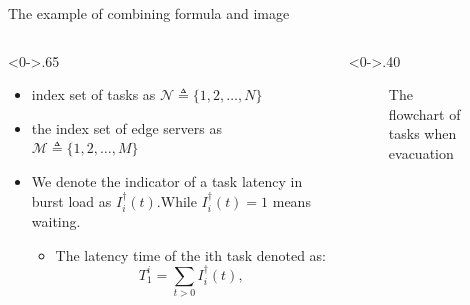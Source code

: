 \documentclass{beamer}%
\begin{document}
\begin{frame}{The example of combining formula and image}
	\begin{columns}[T] %
		\begin{column}<0->{.65\textwidth}
			\begin{itemize}
				\item<1-> index set of tasks as $\mathcal{N} \triangleq\{1,2, \ldots, N\}$
				\item<1->the index set of edge servers as $\mathcal{M} \triangleq\{1,2, \ldots, M\}$
				\item<1->We denote the indicator of a task latency in burst load as $I^{\dagger }_i(t)$.While $I^{\dagger }_i(t) = 1$  means waiting.
				      
				      \begin{itemize}
					      \item<1->The latency time of the ith task denoted as:
					            \begin{equation*} T_1^i = \sum _{t>0} I^{\dagger }_i(t), \tag{1}
					            \end{equation*}
				      \end{itemize}
			\end{itemize}
		\end{column}%
		\hfill%
		\begin{column}<0->{.40\textwidth}
			\begin{figure}[thpb]
				\centering
				\caption{The flowchart of tasks when evacuation}
				\label{fig:tasks}
			\end{figure}
		\end{column}%
	\end{columns}
\end{frame}
\end{document}
